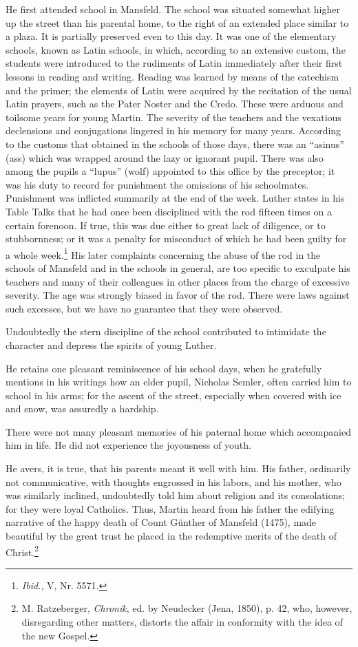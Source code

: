 He first attended school in Mansfeld. The school was situated somewhat higher up the street than his parental home, to the right of an
extended place similar to a plaza. It is partially preserved even to this
day. It was one of the elementary schools, known as Latin schools,
in which, according to an extensive custom, the students were introduced to the rudiments of Latin immediately after their first lessons
in reading and writing. Reading was learned by means of the catechism and the primer; the elements of Latin were acquired by the
recitation of the usual Latin prayers, such as the Pater Noster and
the Credo. These were arduous and toilsome years for young Martin.
The severity of the teachers and the vexatious declensions and conjugations lingered in his memory for many years. According to the
customs that obtained in the schools of those days, there was an
“asinus” (ass) which was wrapped around the lazy or ignorant
pupil. There was also among the pupils a “lupus” (wolf) appointed
to this office by the preceptor; it was his duty to record for punishment the omissions of his schoolmates. Punishment was inflicted
summarily at the end of the week. Luther states in his Table Talks
that he had once been disciplined with the rod fifteen times on a
certain forenoon. If true, this was due either to great lack of
diligence, or to stubbornness; or it was a penalty for misconduct of
which he had been guilty for a whole week.\footnote{\textit{Ibid.}, V, Nr. 5571.}
His later complaints concerning the abuse of the rod in the schools of Mansfeld and in
the schools in general, are too specific to exculpate his teachers and
many of their colleagues in other places from the charge of excessive
severity. The age was strongly biased in favor of the rod. There
were laws against such excesses, but we have no guarantee that they
were observed.

Undoubtedly the stern discipline of the school contributed to
intimidate the character and depress the spirits of young Luther.

He retains one pleasant reminiscence of his school days, when he
gratefully mentions in his writings how an elder pupil, Nicholas
Semler, often carried him to school in his arms; for the ascent of the
street, especially when covered with ice and snow, was assuredly a
hardship.

There were not many pleasant memories of his paternal home
which accompanied him in life. He did not experience the joyousness
of youth.

He avers, it is true, that his parents meant it well with him. His
father, ordinarily not communicative, with thoughts engrossed in
his labors, and his mother, who was similarly inclined, undoubtedly
told him about religion and its consolations; for they were loyal
Catholics. Thus, Martin heard from his father the edifying narrative
of the happy death of Count Günther of Mansfeld (1475), made
beautiful by the great trust he placed in the redemptive merits of
the death of Christ.\footnote{
M. Ratzeberger, \textit{Chronik}, ed. by Neudecker (Jena, 1850), p. 42, who, however, disregarding other matters, distorts the affair in conformity with the idea of the new Gospel.}

